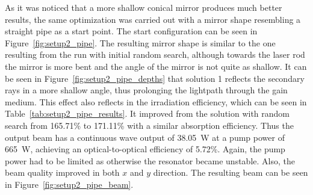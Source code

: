 \documentclass[a4paper,10pt]{article}
\newcommand{\figref}[1]{Figure~\ref{#1}}
\newcommand{\tabref}[1]{Table~\ref{#1}}
\begin{document}
    As it was noticed that a more shallow conical mirror produces much
    better results, the same optimization was carried out with a mirror
    shape resembling a straight pipe as a start point.
    The start configuration can be seen in \figref{fig:setup2_pipe}.
    The resulting mirror shape is similar to the one resulting from the run
    with initial random search, although towards the laser rod the mirror is
    more bent and the angle of the mirror is not quite as shallow.
    It can be seen in \figref{fig:setup2_pipe_depths} that solution 1
    reflects the secondary rays in a more shallow angle, thus prolonging
    the lightpath through the gain medium.
    This effect also reflects in the irradiation efficiency, which
    can be seen in \tabref{tab:setup2_pipe_results}.
    It improved from the solution with random search from 165.71\% to
    171.11\% with a similar absorption efficiency.
    Thus the output beam has a continuous wave output of
    \SI{38.05}{W} at a pump power of \SI{665}{W}, achieving an 
    optical-to-optical efficiency of 5.72\%.
    Again, the pump power had to be limited as otherwise the resonator
    became unstable.
    Also, the beam quality improved in both $x$ and $y$ direction.
    The resulting beam can be seen in \figref{fig:setup2_pipe_beam}.    
\end{document}

